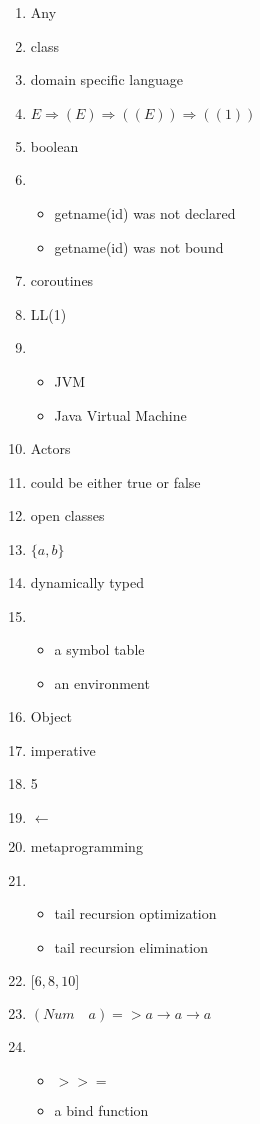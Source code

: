 \documentclass{exam}
\begin{document}
\begin{enumerate}
\item Any
\item class
\item domain specific language
\item $E \Rightarrow (E) \Rightarrow ((E)) \Rightarrow ((1))$
\item boolean
\item \begin{itemize}
\item getname(id) was not declared
\item getname(id) was not bound
\end{itemize}
\item coroutines
\item LL(1)
\item \begin{itemize}
\item JVM
\item Java Virtual Machine
\end{itemize}
\item Actors
\item could be either true or false
\item open classes
\item $\{a,b\}$
\item dynamically typed
\item \begin{itemize}
\item a symbol table
\item an environment
\end{itemize}
\item Object
\item imperative
\item 5
\item $\leftarrow$
\item metaprogramming
\item \begin{itemize}
\item tail recursion optimization
\item tail recursion elimination
\end{itemize}
\item $\lbrack 6, 8, 10\rbrack$
\item $(Num \quad a) => a \rightarrow a \rightarrow a$
\item \begin{itemize}
\item $>>=$
\item a bind function

\end{itemize}
\end{enumerate}
\end{document}
